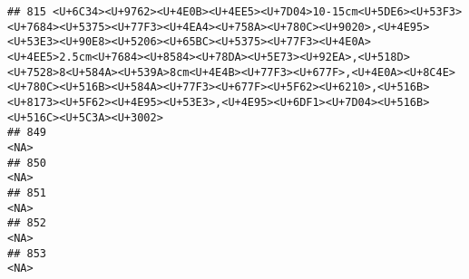 \documentclass[
]{article}
\begin{document}
\begin{verbatim}
## 815 <U+6C34><U+9762><U+4E0B><U+4EE5><U+7D04>10-15cm<U+5DE6><U+53F3><U+7684><U+5375><U+77F3><U+4EA4><U+758A><U+780C><U+9020>,<U+4E95><U+53E3><U+90E8><U+5206><U+65BC><U+5375><U+77F3><U+4E0A><U+4EE5>2.5cm<U+7684><U+8584><U+78DA><U+5E73><U+92EA>,<U+518D><U+7528>8<U+584A><U+539A>8cm<U+4E4B><U+77F3><U+677F>,<U+4E0A><U+8C4E><U+780C><U+516B><U+584A><U+77F3><U+677F><U+5F62><U+6210>,<U+516B><U+8173><U+5F62><U+4E95><U+53E3>,<U+4E95><U+6DF1><U+7D04><U+516B><U+516C><U+5C3A><U+3002>
## 849                                                                                                                                                                                                                                                                                                                                                                                                                                                                                  <NA>
## 850                                                                                                                                                                                                                                                                                                                                                                                                                                                                                  <NA>
## 851                                                                                                                                                                                                                                                                                                                                                                                                                                                                                  <NA>
## 852                                                                                                                                                                                                                                                                                                                                                                                                                                                                                  <NA>
## 853                                                                                                                                                                                                                                                                                                                                                                                                                                                                                  <NA>

\end{verbatim}
\end{document}
